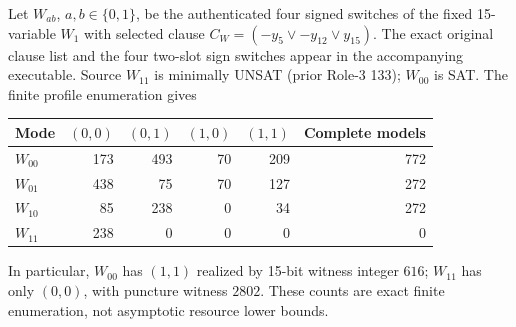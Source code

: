 \documentclass[11pt]{article}
\begin{document}
Let $W_{ab}$, $a,b\in\{0,1\}$, be the authenticated four signed switches of the fixed 15-variable $W_1$ with selected clause $C_W=(-y_5\lor -y_{12}\lor y_{15})$. The exact original clause list and the four two-slot sign switches appear in the accompanying executable. Source $W_{11}$ is minimally UNSAT (prior Role-3 133); $W_{00}$ is SAT. The finite profile enumeration gives
\begin{center}\small\begin{tabular}{lrrrrr}\toprule
Mode & $(0,0)$ & $(0,1)$ & $(1,0)$ & $(1,1)$ & Complete models\\\midrule
$W_{00}$ &173&493&70&209&772\\
$W_{01}$ &438&75&70&127&272\\
$W_{10}$ &85&238&0&34&272\\
$W_{11}$ &238&0&0&0&0\\\bottomrule
\end{tabular}\end{center}
In particular, $W_{00}$ has $(1,1)$ realized by 15-bit witness integer $616$; $W_{11}$ has only $(0,0)$, with puncture witness $2802$. These counts are exact finite enumeration, not asymptotic resource lower bounds.
\end{document}

